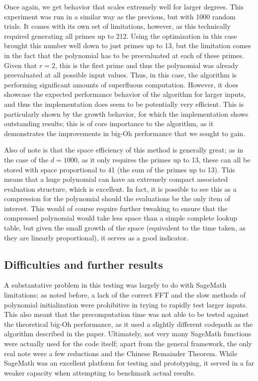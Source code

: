 \documentclass[pageno]{jpaper}
\begin{document}
Once again, we get behavior that scales extremely well for larger degrees.
This experiment was run in a similar way as the previous, but with 1000 random trials.
It comes with its own set of limitations, however, as this technically required generating all primes up to 212.
Using the optimization in this case brought this number well down to just primes up to 13, but the limitation comes in the fact that the polynomial has to be preevaluated at each of these primes.
Given that $r=2$, this is the first prime and thus the polynomial was already preevaluated at all possible input values.
Thus, in this case, the algorithm is performing significant amounts of superfluous computation.
However, it does showcase the expected performance behavior of the algorithm for larger inputs, and thus the implementation does seem to be potentially very efficient.
This is particularly shown by the growth behavior, for which the implementation shows outstanding results; this is of core importance to the algorithm, as it demonstrates the improvements in big-Oh performance that we sought to gain.

Also of note is that the space efficiency of this method is generally great; as in the case of the $d=1000$, as it only requires the primes up to 13, these can all be stored with space proportional to 41 (the sum of the primes up to 13).
This means that a huge polynomial can have an extremely compact associated evaluation structure, which is excellent.
In fact, it is possible to see this as a compression for the polynomial should the evaluations be the only item of interest.
This would of course require further tweaking to ensure that the compressed polynomial would take less space than a simple complete lookup table, but given the small growth of the space (equivalent to the time taken, as they are linearly proportional), it serves as a good indicator.

\subsection{Difficulties and further results}
A substantative problem in this testing was largely to do with SageMath limitations; as noted before, a lack of the correct FFT and the slow methods of polynomial initialization were prohibitive in trying to rapidly test larger inputs.
This also meant that the precomputation time was not able to be tested against the theoretical big-Oh performance, as it used a slightly different codepath as the algorithm described in the paper.
Ultimately, not very many SageMath functions were actually used for the code itself; apart from the general framework, the only real note were a few reductions and the Chinese Remainder Theorem.
While SageMath was an excellent platform for testing and prototyping, it served in a far weaker capacity when attempting to benchmark actual results.
\end{document}
